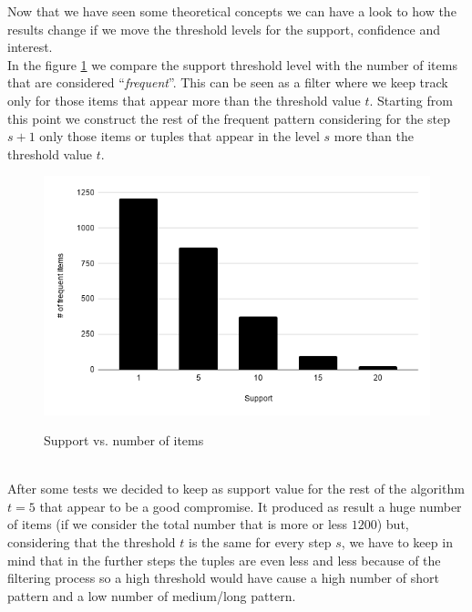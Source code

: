 \documentclass{acm_proc_article-sp-sigmod09}
\begin{document}
	Now that we have seen some theoretical concepts we can have a look to how the results change if we move the threshold levels for the support, confidence and interest.\\
	In the figure \ref{fig:support} we compare the support threshold level with the number of items that are considered ``\textit{frequent}''. This can be seen as a filter where we keep track only for those items that appear more than the threshold value $t$. Starting from this point we construct the rest of the frequent pattern considering for the step $s+1$ only those items or tuples that appear in the level $s$ more than the threshold value $t$.
	\begin{figure}[h]
		\caption{Support vs. number of items}
		\centering
		\includegraphics[scale=0.4]{support_items.png}
		\label{fig:support}
	\end{figure}
	\\
	After some tests we decided to keep as support value for the rest of the algorithm $t=5$ that appear to be a good compromise. It produced as result a huge number of items (if we consider the total number that is more or less $1200$) but, considering that the threshold $t$ is the same for every step $s$, we have to keep in mind that in the further steps the tuples are even less and less because of the filtering process so a high threshold would have cause a high number of short pattern and a low number of medium/long pattern.
	
\end{document}
